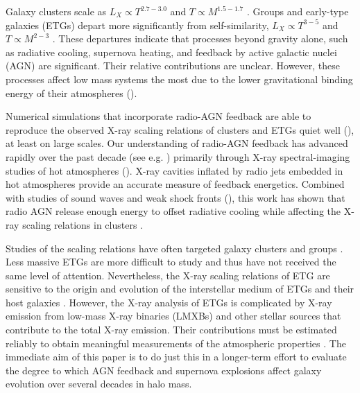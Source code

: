 \documentclass[iop]{emulateapj}
\begin{document}
Galaxy clusters scale as $L_X \propto T^{2.7-3.0}$ and $T \propto M^{1.5-1.7}$ \citep{Vikhlinin:06, Vikhlinin:09}. Groups and early-type galaxies (ETGs) depart more significantly from self-similarity, $L_X \propto T^{3-5}$ and $T \propto M^{2-3}$ \citep[][and references therein]{Boroson:10, Kim:13}.  These departures indicate that processes beyond gravity alone, such as radiative cooling, supernova heating, and feedback by active galactic nuclei (AGN) are significant. Their relative contributions are unclear. However, these processes affect low mass systems the most due to the lower gravitational binding energy of their atmospheres (\citealt{Giodini:13}). 

Numerical simulations that incorporate radio-AGN feedback are able to reproduce the observed X-ray scaling relations of clusters and ETGs quiet well (\citealt{Borgani:05, Borgani:06, Sijacki:06, Puchwein:08, Borgani:09, Booth:10, Schaye:10}), at least on large scales. Our understanding of radio-AGN feedback has advanced rapidly over the past decade (see e.g. \citealt{McNamara:07, McNamara:12}) primarily through X-ray spectral-imaging studies of hot atmospheres (\citealt{Birzan:04, Rafferty:06, Shin:16, Hlavacek:15}).  X-ray cavities inflated by radio jets embedded in hot atmospheres provide an accurate measure of feedback energetics.  Combined with studies of sound waves and weak shock fronts (\citealt{Nulsen:05, Borgani:05, Borgani:06, Borgani:09, Randall:15, Fabian:17, Forman:17}),  this work has shown that radio AGN release enough energy to offset radiative cooling while affecting the X-ray scaling relations in clusters \citep{Main:17}.   

Studies of the scaling relations have often targeted galaxy clusters and groups \citep{OSullivan:01, David:06, Boroson:10, Babyk:14a, Babyk_book:15, Su:15, Goulding:16}.  Less massive ETGs are more difficult to study and thus have not received the same level of attention.  Nevertheless, the X-ray scaling relations of ETG are sensitive to the  origin and evolution of the interstellar medium of ETGs and their host galaxies \citep[see e.g.][for more details]{Bender:89, Fabbiano:89, Mathews:90, White:91, David:91, Mathews:03, Khos:04}. However, the X-ray analysis of ETGs is complicated by X-ray emission from low-mass X-ray binaries (LMXBs) and other stellar sources that contribute to the total X-ray emission. Their contributions must be estimated reliably to obtain meaningful measurements of the atmospheric properties \citep{Revnivtsev:07a, Revnivtsev:08a, Boroson:10, Kim:13, Kim:15}. The immediate aim of this paper is to do just this in a longer-term effort to evaluate the degree to which AGN feedback and supernova explosions affect galaxy evolution over several decades in halo mass.
\end{document}
